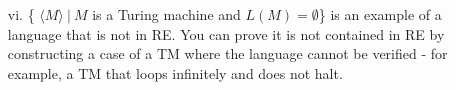 \documentclass[10pt,letter]{article}
\begin{document}
\begin{enumerate}
\item[vi.] \{ $\langle M \rangle\ |\ M$ is a Turing machine and $L(M) = \emptyset$\} is an example of a language that is not in RE. You can prove it is not contained in RE by constructing a case of a TM where the language cannot be verified - for example, a TM that loops infinitely and does not halt.
\end{enumerate}
\end{document}
